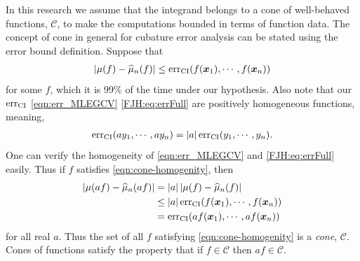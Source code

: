 \documentclass{svjour3}                     %
\newcommand{\bm}[1]{\boldsymbol{#1}}
\newcommand{\vx}{\bm{x}}
\newcommand{\hmu}{\widehat{\mu}}
\newcommand{\CI}{\textup{CI}}
\newcommand{\NICE}{\textup{nice}}
\newcommand{\err}{\textup{err}}
\def\abs#1{\ensuremath{\left \lvert #1 \right \rvert}}
\newcommand{\JRNote}[1]{{\textcolor{green}{JR: #1}}}
\begin{document}

In this research we assume that the integrand belongs to a cone of well-behaved functions, $\mathscr{C}$, to make the computations bounded in terms of function data. The concept of cone in general for cubature error analysis can be stated using the error bound definition. 
Suppose that 
\begin{align}
\label{eqn:cone-homogenity}
\abs{\mu(f) - \hmu_n(f)} \le \err_{\CI} (f(\vx_1), \cdots, f(\vx_n))
\end{align}
for some $f$, which it is 99\% of the time under our hypothesis. Also note that our $\err_{\CI}$ \eqref{eqn:err_MLEGCV} \eqref{FJH:eq:errFull} are positively homogeneous functions, meaning, 
\begin{align*}
\err_{\CI} (a y_1, \cdots, a y_n) = \abs{a} \err_{\CI} ( y_1, \cdots,  y_n).
\end{align*}
One can verify the homogeneity of \eqref{eqn:err_MLEGCV} and \eqref{FJH:eq:errFull} easily.
Thus if $f$ satisfies \eqref{eqn:cone-homogenity}, then
\begin{align*}
\abs{\mu(af) - \hmu_n(af)} &= \abs{a} \abs{\mu(f) - \hmu_n(f)} \\
& \le \abs{a} \err_{\CI} (f(\vx_1), \cdots, f(\vx_n) ) \\
& = \err_{\CI} (a f(\vx_1), \cdots, a f(\vx_n))
\end{align*}
for all real $a$. Thus the set of all $f$ satisfying \eqref{eqn:cone-homogenity} is a \emph{cone}, $\mathscr{C}$. Cones of functions satisfy the property that if $f \in \mathscr{C}$ then $af \in \mathscr{C}$.

\end{document}
